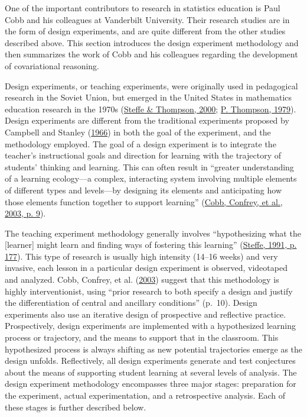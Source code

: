 \documentclass[11pt]{umnthesis}
\begin{document}
One of the important contributors to research in statistics education is Paul Cobb and his colleagues at Vanderbilt University. Their research studies are in the form of design experiments, and are quite different from the other studies described above. This section introduces the design experiment methodology and then summarizes the work of Cobb and his colleagues regarding the development of covariational reasoning.

Design experiments, or teaching experiments, were originally used in pedagogical research in the Soviet Union, but emerged in the United States in mathematics education research in the 1970s (\protect\hyperlink{ref-steffe:2000}{Steffe \& Thompson, 2000}; \protect\hyperlink{ref-thompson:1979}{P. Thompson, 1979}). Design experiments are different from the traditional experiments proposed by Campbell and Stanley (\protect\hyperlink{ref-campbell:1966}{1966}) in both the goal of the experiment, and the methodology employed. The goal of a design experiment is to integrate the teacher's instructional goals and direction for learning with the trajectory of students' thinking and learning. This can often result in ``greater understanding of a learning ecology---a complex, interacting system involving multiple elements of different types and levels---by designing its elements and anticipating how those elements function together to support learning'' (\protect\hyperlink{ref-cobb:2003}{Cobb, Confrey, et al., 2003, p. 9}).

The teaching experiment methodology generally involves ``hypothesizing what the {[}learner{]} might learn and finding ways of fostering this learning'' (\protect\hyperlink{ref-steffe:1991}{Steffe, 1991, p. 177}). This type of research is usually high intensity (14--16 weeks) and very invasive, each lesson in a particular design experiment is observed, videotaped and analyzed. Cobb, Confrey, et al. (\protect\hyperlink{ref-cobb:2003}{2003}) suggest that this methodology is highly interventionist, using ``prior research to both specify a design and justify the differentiation of central and ancillary conditions'' (p.~10). Design experiments also use an iterative design of prospective and reflective practice. Prospectively, design experiments are implemented with a hypothesized learning process or trajectory, and the means to support that in the classroom. This hypothesized process is always shifting as new potential trajectories emerge as the design unfolds. Reflectively, all design experiments generate and test conjectures about the means of supporting student learning at several levels of analysis. The design experiment methodology encompasses three major stages: preparation for the experiment, actual experimentation, and a retrospective analysis. Each of these stages is further described below.
\end{document}

